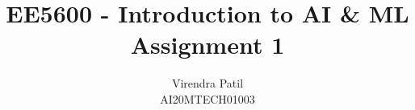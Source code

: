 \documentclass[journal,12pt]{IEEEtran}
\begin{document}
%


\newtheorem{theorem}{Theorem}[section]
\newtheorem{problem}{Problem}
\newtheorem{proposition}{Proposition}[section]
\newtheorem{lemma}{Lemma}[section]
\newtheorem{corollary}[theorem]{Corollary}
\newtheorem{example}{Example}[section]
\newtheorem{definition}[problem]{Definition}
\newcommand{\BEQA}{\begin{eqnarray}}
\newcommand{\EEQA}{\end{eqnarray}}
\newcommand{\define}{\stackrel{\triangle}{=}}

\providecommand{\mbf}{\mathbf}
\providecommand{\pr}[1]{\ensuremath{\Pr\left(#1\right)}}
\providecommand{\qfunc}[1]{\ensuremath{Q\left(#1\right)}}
\providecommand{\sbrak}[1]{\ensuremath{{}\left[#1\right]}}
\providecommand{\lsbrak}[1]{\ensuremath{{}\left[#1\right.}}
\providecommand{\rsbrak}[1]{\ensuremath{{}\left.#1\right]}}
\providecommand{\brak}[1]{\ensuremath{\left(#1\right)}}
\providecommand{\lbrak}[1]{\ensuremath{\left(#1\right.}}
\providecommand{\rbrak}[1]{\ensuremath{\left.#1\right)}}
\providecommand{\cbrak}[1]{\ensuremath{\left\{#1\right\}}}
\providecommand{\lcbrak}[1]{\ensuremath{\left\{#1\right.}}
\providecommand{\rcbrak}[1]{\ensuremath{\left.#1\right\}}}
\theoremstyle{remark}
\newtheorem{rem}{Remark}
\newcommand{\sgn}{\mathop{\mathrm{sgn}}}
\providecommand{\abs}[1]{\left\vert#1\right\vert}
\providecommand{\res}[1]{\Res\displaylimits_{#1}} 
\providecommand{\norm}[1]{\left\lVert#1\right\rVert}
\providecommand{\mtx}[1]{\mathbf{#1}}
\providecommand{\mean}[1]{E\left[ #1 \right]}
\providecommand{\fourier}{\overset{\mathcal{F}}{ \rightleftharpoons}}
\providecommand{\system}{\overset{\mathcal{H}}{ \longleftrightarrow}}
\newcommand{\solution}{\noindent \textbf{Solution: }}
\newcommand{\cosec}{\,\text{cosec}\,}
\providecommand{\dec}[2]{\ensuremath{\overset{#1}{\underset{#2}{\gtrless}}}}
\newcommand{\myvec}[1]{\ensuremath{\begin{pmatrix}#1\end{pmatrix}}}
\newcommand{\cmyvec}[1]{\ensuremath{\begin{pmatrix*}[c]#1\end{pmatrix*}}}
\newcommand{\mydet}[1]{\ensuremath{\begin{vmatrix}#1\end{vmatrix}}}
\newcommand{\proj}[2]{\textbf{proj}_{\vec{#1}}\vec{#2}}
\let\StandardTheFigure\thefigure
\let\vec\mathbf
\title{EE5600 - Introduction to AI \& ML\\Assignment 1}
\author{Virendra Patil\\AI20MTECH01003}	
\maketitle
\end{document}

